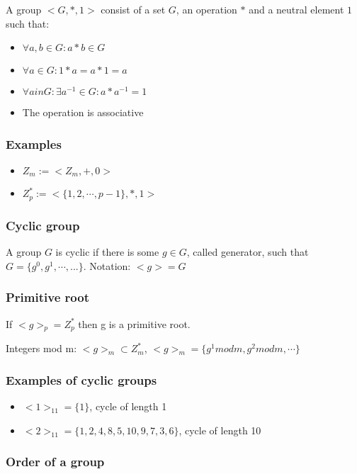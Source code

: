 \documentclass[a4paper]{scrreprt}
\begin{document}
A group $<G, *, 1>$ consist of a set $G$, an operation $*$ and a neutral element $1$ such that:
\begin{itemize}
	\item $\forall a, b \in G: a * b \in G$
	\item $\forall a \in G: 1 * a = a * 1 = a$
	\item $\forall a in G: \exists a^{-1} \in G: a * a^{-1} = 1$
	\item The operation is associative
\end{itemize}

\subsubsection{Examples}

\begin{itemize}
	\item $Z_m := <Z_m, +, 0>$
	\item $Z^{*}_p := <\{1, 2, \cdots, p - 1\}, *, 1>$
\end{itemize}

\subsubsection{Cyclic group}

A group $G$ is cyclic if there is some $g \in G$, called generator, such that
$G = \{g^0, g^1, \cdots, ...\}$. Notation: $<g> = G$

\subsubsection{Primitive root}

If $<g>_p = Z^{*}_p$ then g is a primitive root.

Integers mod m: $<g>_m \subset Z^{*}_m$, $<g>_m = \{g^1 mod m, g^2 mod m, \cdots\}$

\subsubsection{Examples of cyclic groups}

\begin{itemize}
	\item $<1>_{11} = \{1\}$, cycle of length 1
	\item $<2>_{11} = \{1, 2, 4, 8, 5, 10, 9, 7, 3, 6\}$, cycle of length 10
\end{itemize}

\subsubsection{Order of a group}
\end{document}
